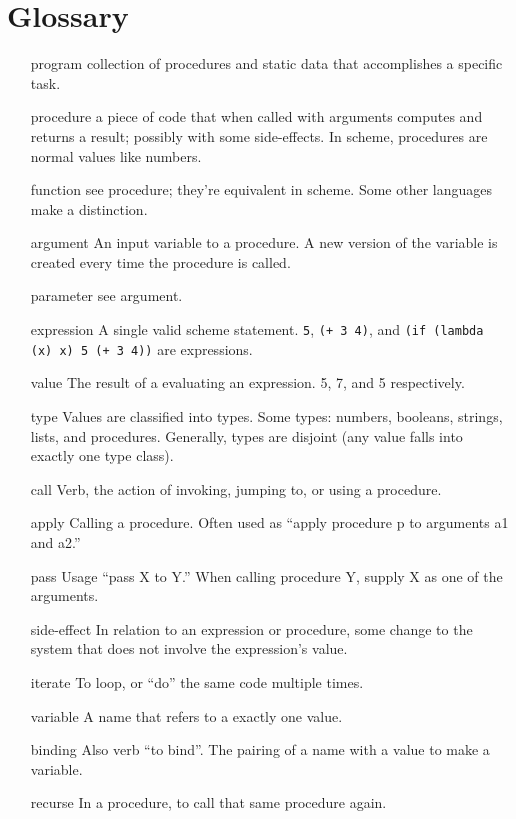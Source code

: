 


\section*{Glossary}
\begin{itemize}
\item [program] collection of procedures and static data that
  accomplishes a specific task.
\item [procedure] a piece of code that when called with arguments
  computes and returns a result; possibly with some side-effects.  In
  scheme, procedures are normal values like numbers.
\item [function] see procedure; they're equivalent in scheme.  Some
  other languages make a distinction.
\item [argument] An input variable to a procedure.  A new version of
  the variable is created every time the procedure is called.
\item [parameter] see argument.
\item [expression] A single valid scheme statement.  {\tt 5}, {\tt (+
  3 4)}, and {\tt (if (lambda (x) x) 5 (+ 3 4))} are expressions.
\item [value] The result of a evaluating an expression. 5, 7, and 5
  respectively.
\item [type] Values are classified into types.  Some types: numbers,
  booleans, strings, lists, and procedures.  Generally, types are
  disjoint (any value falls into exactly one type class).
\item [call] Verb, the action of invoking, jumping to, or using a
  procedure.
\item [apply] Calling a procedure.  Often used as ``apply procedure p
  to arguments a1 and a2.''
\item [pass] Usage ``pass X to Y.''  When calling procedure Y, supply
  X as one of the arguments.
\item [side-effect] In relation to an expression or procedure, some
  change to the system that does not involve the expression's value.  
\item [iterate] To loop, or ``do'' the same code multiple times.
\item [variable] A name that refers to a exactly one value.
\item [binding] Also verb ``to bind''.  The pairing of a name with a
  value to make a variable.
\item [recurse] In a procedure, to call that same procedure again.
\end{itemize}

